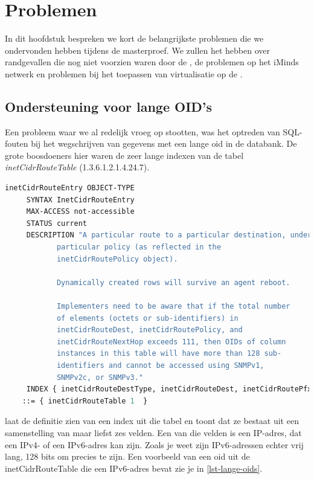 \chapter{Problemen}

In dit hoofdstuk bespreken we kort de belangrijkste problemen die we ondervonden hebben tijdens de masterproef.
We zullen het hebben over randgevallen die nog niet voorzien waren door de \nwmretriever{},
de problemen op het iMinds netwerk en problemen bij het toepassen van virtualisatie op de \vwall{}.


\section{Ondersteuning voor lange OID's}
\label{probleem-lange-oids}

Een probleem waar we al redelijk vroeg op stootten, was het optreden van SQL-fouten bij het wegschrijven van gegevens met een lange \gls{oid} in de databank.
De grote boosdoeners hier waren de zeer lange indexen van de tabel \textit{inetCidrRouteTable} (1.3.6.1.2.1.4.24.7).

\begin{lstlisting}[language=asn.1, float=h, caption={Definitie van een inetCidrRouteEntry}, label=lst-inetCidrRouteEntry]
inetCidrRouteEntry OBJECT-TYPE 
	 SYNTAX InetCidrRouteEntry
	 MAX-ACCESS not-accessible
	 STATUS current
	 DESCRIPTION "A particular route to a particular destination, under a 
            particular policy (as reflected in the 
            inetCidrRoutePolicy object). 
 
            Dynamically created rows will survive an agent reboot. 
 
            Implementers need to be aware that if the total number 
            of elements (octets or sub-identifiers) in 
            inetCidrRouteDest, inetCidrRoutePolicy, and 
            inetCidrRouteNextHop exceeds 111, then OIDs of column 
            instances in this table will have more than 128 sub- 
            identifiers and cannot be accessed using SNMPv1, 
            SNMPv2c, or SNMPv3."
	 INDEX { inetCidrRouteDestType, inetCidrRouteDest, inetCidrRoutePfxLen, inetCidrRoutePolicy, inetCidrRouteNextHopType, inetCidrRouteNextHop } 
 	::= { inetCidrRouteTable 1  }
\end{lstlisting}

 laat de definitie zien van een index uit die tabel en toont dat ze bestaat uit een samenstelling van maar liefst zes velden.
Een van die velden is een IP-adres, dat een IPv4- of een IPv6-adres kan zijn.
Zoals je weet zijn IPv6-adressen echter vrij lang, 128 bits om precies te zijn.
Een voorbeeld van een \gls{oid} uit de inetCidrRouteTable die een IPv6-adres bevat zie je in \cref{lst-lange-oids}.

